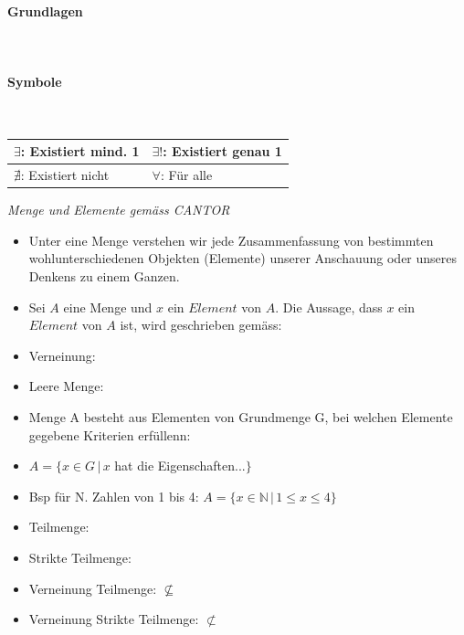 \noindent
\paragraph{Grundlagen}\mbox{}\\
\paragraph{Symbole}\mbox{}\\
\begin{tabularx}{\columnwidth}{@{}X|X@{}}
    \hline
    $\exists$: Existiert mind. 1 & $\exists!$: Existiert genau 1 \\ \hline
    $\nexists$: Existiert nicht  & $\forall$: Für alle           \\ \hline
\end{tabularx}
\vspace{1mm}

\noindent
\textit{Menge und Elemente gemäss CANTOR}\linebreak
\begin{itemize}
    \item Unter eine Menge verstehen wir jede Zusammenfassung von bestimmten wohlunterschiedenen Objekten (Elemente) unserer Anschauung oder unseres Denkens zu einem Ganzen.
    \item Sei $A$ eine Menge und $x$ ein $Element$ von $A$. Die Aussage, dass $x$ ein $Element$ von $A$ ist, wird geschrieben gemäss: 
    \item Verneinung: 
    \item Leere Menge: \fbox{$ \varnothing = \{\} $}
    \item Menge A besteht aus Elementen von Grundmenge G, bei welchen Elemente gegebene Kriterien erfüllenn:
    \item $A = \{x \in G\,|\,x$ hat die Eigenschaften...$ \}$
    \item Bsp für N. Zahlen von 1 bis 4: $A = \{x \in \mathbb{N} \,|\,1 \leq  x \leq  4 \}$
    \item Teilmenge: 
    \item Strikte Teilmenge: 
    \item Verneinung Teilmenge: $\nsubseteq$
    \item Verneinung Strikte Teilmenge: $\not\subset$
\end{itemize}
\vspace{1mm}

